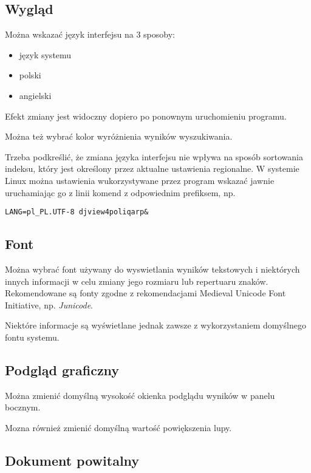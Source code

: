 \documentclass{mwart}
\begin{document}
\subsection{Wygląd}
\label{sec:wygld}

Można wskazać język interfejsu na 3 sposoby:
\begin{itemize}
\item język systemu
\item polski
\item angielski
\end{itemize}
Efekt zmiany jest widoczny dopiero po ponownym uruchomieniu programu.

Można też wybrać kolor wyróżnienia wyników wyszukiwania.

Trzeba podkreślić, że zmiana języka interfejsu nie wpływa na sposób
sortowania indeksu, który jest określony przez aktualne ustawienia
regionalne. W systemie Linux można ustawienia wukorzystywane przez
program wskazać jawnie uruchamiając go z linii komend z odpowiednim
prefiksem, np.
\begin{verbatim}
LANG=pl_PL.UTF-8 djview4poliqarp&
\end{verbatim}


\subsection{Font}
\label{sec:font}

Można wybrać font używany do wyswietlania wyników tekstowych i
niektórych innych informacji w celu zmiany jego rozmiaru lub
repertuaru znaków. Rekomendowane są fonty zgodne z rekomendacjami
Medieval Unicode Font Initiative, np. \textsl{Junicode}.

Niektóre informacje są wyświetlane jednak zawsze z wykorzystaniem
domyślnego fontu systemu.

\subsection{Podgląd graficzny}
\label{sec:podgld-graficzny}

Można zmienić domyślną wysokość okienka podglądu wyników w panelu
bocznym.

Mozna również zmienić domyślną wartość powiększenia lupy.

\subsection{Dokument powitalny}
\label{sec:dokument-powitalny}
\end{document}
